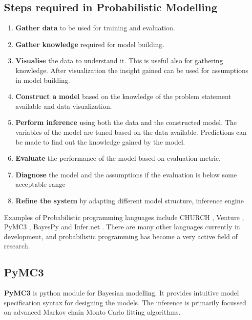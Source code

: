 \subsection*{Steps required in Probabilistic Modelling}
\label{sub:steps}
\begin{enumerate}
	\item \textbf{Gather data} to be used for training and evaluation.
    \item \textbf{Gather knowledge} required for model building.
    \item \textbf{Visualise} the data to understand it. This is useful also for gathering knowledge. After visualization the insight gained can be used for assumptions in model building.
    \item \textbf{Construct a model} based on the knowledge of the problem statement available and data visualization. 
    \item \textbf{Perform inference} using both the data and the constructed model. The variables of the model are tuned based on the data available. Predictions can be made to find out the knowledge gained by the model.
    \item \textbf{Evaluate} the performance of the model based on evaluation metric.
    \item \textbf{Diagnose} the model and the assumptions if the evaluation is below some acceptable range
    \item \textbf{Refine the system} by adapting different model structure, inference engine

\end{enumerate}

Examples of Probabilistic programming languages include CHURCH \cite{goodman_church_2012}, Venture \cite{mansinghka_venture_2014}, PyMC3 \cite{salvatier_probabilistic_2015}, BayesPy \cite{luttinen_bayespy_2014} and Infer.net \cite{minka_2010}. There are many other languages currently in development, and probabilistic programming has become a very active field of research.

\subsection{PyMC3}

\textbf{PyMC3} is python module for Bayesian modelling. It provides intuitive model specification syntax for designing the models. The inference is primarily focussed on advanced Markov chain Monto Carlo fitting algorithms.


